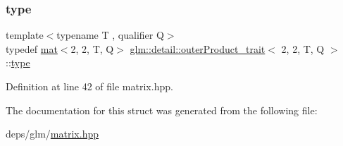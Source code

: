 \subsubsection{\texorpdfstring{type}{type}}
{\footnotesize\ttfamily template$<$typename T , qualifier Q$>$ \\
typedef \hyperlink{structglm_1_1mat}{mat}$<$2, 2, T, Q$>$ \hyperlink{structglm_1_1detail_1_1outerProduct__trait}{glm\+::detail\+::outer\+Product\+\_\+trait}$<$ 2, 2, T, Q $>$\+::\hyperlink{structglm_1_1mat_3_012_00_012_00_01T_00_01Q_01_4}{type}}



Definition at line 42 of file matrix.\+hpp.



The documentation for this struct was generated from the following file\+:\begin{DoxyCompactItemize}
\item 
deps/glm/\hyperlink{matrix_8hpp}{matrix.\+hpp}\end{DoxyCompactItemize}
